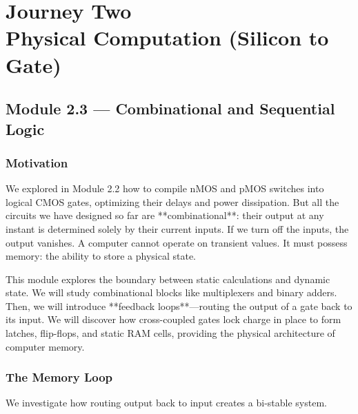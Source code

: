 \documentclass[12pt, a4paper]{book}
\begin{document}
\setcounter{chapter}{1}
\chapter[Journey 2 --- Physical Computation (Silicon to Gate)]
        {Journey Two\\[8pt]
         \textcolor{ModuleColor}{\large Physical Computation (Silicon to Gate)}}
\setcounter{section}{2}

\section{Module 2.3 --- Combinational and Sequential Logic}
\label{sec:mod2.3}

\subsection*{Motivation}

We explored in Module 2.2 how to compile nMOS and pMOS switches into logical CMOS gates, optimizing their delays and power dissipation.
But all the circuits we have designed so far are **combinational**: their output at any instant is determined solely by their current inputs. If we turn off the inputs, the output vanishes.
A computer cannot operate on transient values. It must possess memory: the ability to store a physical state.

This module explores the boundary between static calculations and dynamic state.
We will study combinational blocks like multiplexers and binary adders.
Then, we will introduce **feedback loops**—routing the output of a gate back to its input.
We will discover how cross-coupled gates lock charge in place to form latches, flip-flops, and static RAM cells, providing the physical architecture of computer memory.

\subsection{The Memory Loop}

We investigate how routing output back to input creates a bi-stable system.
\end{document}
